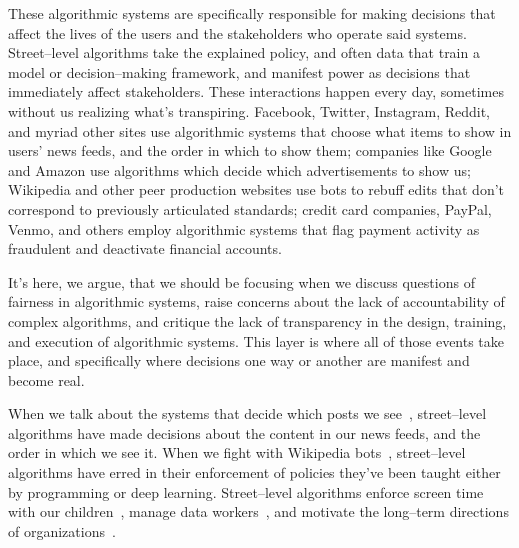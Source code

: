 \documentclass[main]{subfiles}
\begin{document}
These algorithmic systems are specifically responsible for making
decisions that affect the lives of the users and the stakeholders who operate said systems.
Street--level algorithms take the explained policy,
and often data that train a model or decision--making framework,
and manifest power as decisions that immediately affect stakeholders.
These interactions happen every day, sometimes without us realizing what's transpiring.
Facebook, Twitter, Instagram, Reddit, and myriad other sites
use algorithmic systems that choose
what items to show in users' news feeds, and the order in which to show them;
companies like Google and Amazon
use algorithms which decide which advertisements to show us;
Wikipedia and other peer production websites
use bots to rebuff edits that don't correspond to previously articulated standards;
credit card companies, PayPal, Venmo, and others
employ algorithmic systems that flag payment activity as fraudulent and deactivate financial accounts.

It's here, we argue, that we should be focusing when we discuss
questions of fairness in algorithmic systems,
raise concerns about the lack of accountability of complex algorithms, and
critique the lack of transparency in the design, training, and execution of algorithmic systems.
This layer is where all of those events take place, and
specifically where decisions one way or another are manifest and become real.

When we talk about the systems that decide which posts we see~\cite{Eslami:2015:IAA:2702123.2702556},
street--level algorithms have made decisions about the content in our news feeds, and the order in which we see it.
When we fight with Wikipedia bots~\cite{10.1371/journal.pone.0171774,geiger2018lives,Geiger:2013:LBW:2491055.2491061},
street--level algorithms have erred in their enforcement of policies they've been taught either by programming or deep learning.
Street--level algorithms enforce screen time with our children~\cite{Hiniker:2016:STT:2858036.2858278},
manage data workers~\cite{Boukhelifa:2017:DWC:3025453.3025738,Valentine:2017:FOC:3025453.3025811,foundry},
and motivate the long--term directions of organizations~\cite{Bopp:2017:DDN:3025453.3025694}.
\end{document}
